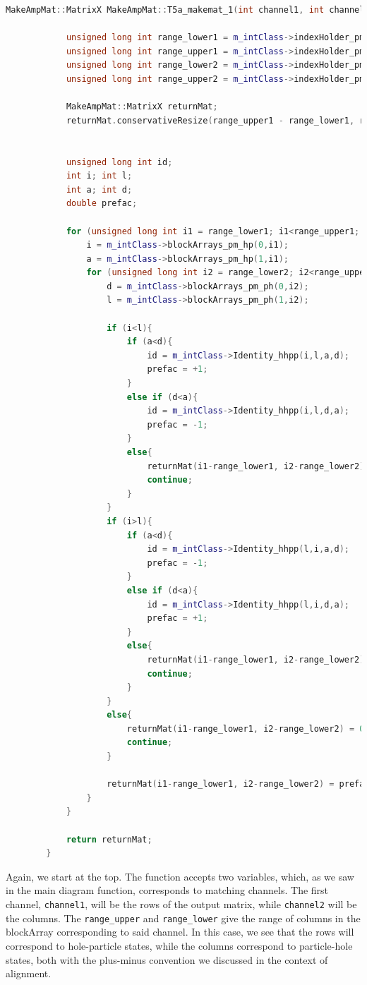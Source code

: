 \documentclass[10pt,twoside]{report}
\begin{document}
	\newpage
	\begin{lstlisting}[language=C++]
		MakeAmpMat::MatrixX MakeAmpMat::T5a_makemat_1(int channel1, int channel2){
		
			unsigned long int range_lower1 = m_intClass->indexHolder_pm_hp(0, channel1);
			unsigned long int range_upper1 = m_intClass->indexHolder_pm_hp(1, channel1);
			unsigned long int range_lower2 = m_intClass->indexHolder_pm_ph(0, channel2);
			unsigned long int range_upper2 = m_intClass->indexHolder_pm_ph(1, channel2);
		
			MakeAmpMat::MatrixX returnMat;
			returnMat.conservativeResize(range_upper1 - range_lower1, range_upper2 - range_lower2);
		
		
			unsigned long int id;
			int i; int l;
			int a; int d;
			double prefac;
		
			for (unsigned long int i1 = range_lower1; i1<range_upper1; i1++){
				i = m_intClass->blockArrays_pm_hp(0,i1);
				a = m_intClass->blockArrays_pm_hp(1,i1);
				for (unsigned long int i2 = range_lower2; i2<range_upper2; i2++){
					d = m_intClass->blockArrays_pm_ph(0,i2);
					l = m_intClass->blockArrays_pm_ph(1,i2);
		
					if (i<l){
						if (a<d){
							id = m_intClass->Identity_hhpp(i,l,a,d);
							prefac = +1;
						}
						else if (d<a){
							id = m_intClass->Identity_hhpp(i,l,d,a);
							prefac = -1;
						}
						else{
							returnMat(i1-range_lower1, i2-range_lower2) = 0;
							continue;
						}
					}
					if (i>l){
						if (a<d){
							id = m_intClass->Identity_hhpp(l,i,a,d);
							prefac = -1;
						}
						else if (d<a){
							id = m_intClass->Identity_hhpp(l,i,d,a);
							prefac = +1;
						}
						else{
							returnMat(i1-range_lower1, i2-range_lower2) = 0;
							continue;
						}
					}
					else{
						returnMat(i1-range_lower1, i2-range_lower2) = 0;
						continue;
					}
		
					returnMat(i1-range_lower1, i2-range_lower2) = prefac*T2_elements[id];
				}
			}
		
			return returnMat;
		}
	\end{lstlisting}
	
	Again, we start at the top. The function accepts two variables, which, as we saw in the main diagram function, corresponds to matching channels. The first channel, \texttt{channel1}, will be the rows of the output matrix, while \texttt{channel2} will be the columns. The \texttt{range\_upper} and \texttt{range\_lower} give the range of columns in the blockArray corresponding to said channel. In this case, we see that the rows will correspond to hole-particle states, while the columns correspond to particle-hole states, both with the plus-minus convention we discussed in the context of alignment.\\
	
\end{document}
